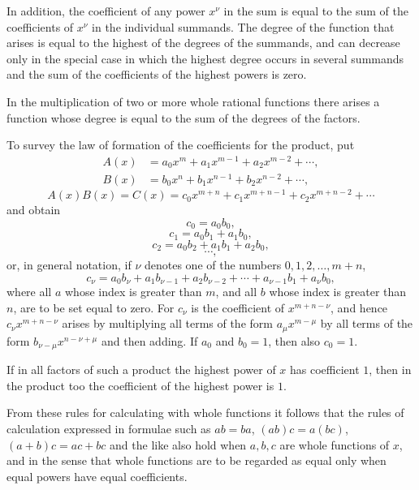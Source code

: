 \documentclass[11pt]{article}
\begin{document}
In addition, the coefficient of any power $x^\nu$ in the sum is equal to the sum of the coefficients of $x^\nu$ in the individual summands. The degree of the function that arises is equal to the highest of the degrees of the summands, and can decrease only in the special case in which the highest degree occurs in several summands and the sum of the coefficients of the highest powers is zero.

In the multiplication of two or more whole rational functions there arises a function whose degree is equal to the sum of the degrees of the factors.

To survey the law of formation of the coefficients for the product, put
\begin{equation}
\begin{aligned}
 A(x)&=a_0x^m+a_1x^{m-1}+a_2x^{m-2}+\cdots,\\
 B(x)&=b_0x^n+b_1x^{n-1}+b_2x^{n-2}+\cdots,
\end{aligned}
\tag{2}
\end{equation}
\begin{equation}
 A(x)B(x)=C(x)=c_0x^{m+n}+c_1x^{m+n-1}+c_2x^{m+n-2}+\cdots
\tag{3}
\end{equation}
and obtain
\[
 c_0=a_0b_0,
\]
\[
 c_1=a_0b_1+a_1b_0,
\]
\[
 c_2=a_0b_2+a_1b_1+a_2b_0,
\]
\[
 \cdots,
\]
or, in general notation, if $\nu$ denotes one of the numbers $0,1,2,
\ldots,m+n$,
\begin{equation}
 c_\nu=a_0b_\nu+a_1b_{\nu-1}+a_2b_{\nu-2}+\cdots+a_{\nu-1}b_1+a_\nu b_0,
\tag{4}
\end{equation}
where all $a$ whose index is greater than $m$, and all $b$ whose index is greater than $n$, are to be set equal to zero. For $c_\nu$ is the coefficient of $x^{m+n-\nu}$, and hence $c_\nu x^{m+n-\nu}$ arises by multiplying all terms of the form $a_\mu x^{m-\mu}$ by all terms of the form $b_{\nu-\mu}x^{n-\nu+\mu}$ and then adding. If $a_0$ and $b_0=1$, then also $c_0=1$.

If in all factors of such a product the highest power of $x$ has coefficient $1$, then in the product too the coefficient of the highest power is $1$.

From these rules for calculating with whole functions it follows that the rules of calculation expressed in formulae such as $ab=ba$, $(ab)c=a(bc)$, $(a+b)c=ac+bc$ and the like also hold when $a,b,c$ are whole functions of $x$, and in the sense that whole functions are to be regarded as equal only when equal powers have equal coefficients.
\end{document}
